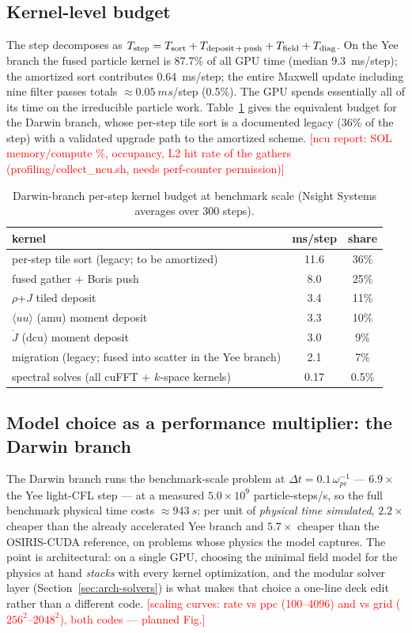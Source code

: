 \documentclass[11pt]{article}
\newcommand{\tocheck}[1]{\textcolor{red}{[#1]}}
\begin{document}
\subsection{Kernel-level budget}
\label{sec:budget}
The step decomposes as
$T_{\rm step}=T_{\rm sort}+T_{\rm deposit\,+\,push}+T_{\rm field}+T_{\rm diag}$.
On the Yee branch the fused particle kernel is 87.7\% of all GPU time
(median \SI{9.3}{ms}/step); the amortized sort contributes
\SI{0.64}{ms}/step; the entire Maxwell update including nine filter
passes totals $\approx\SI{0.05}{ms}$/step (0.5\%). The GPU spends
essentially all of its time on the irreducible particle work.
Table~\ref{tab:darwinstep} gives the equivalent budget for the Darwin
branch, whose per-step tile sort is a documented legacy (36\% of the
step) with a validated upgrade path to the amortized scheme.
\tocheck{ncu report: SOL memory/compute \%, occupancy, L2 hit rate of
the gathers (profiling/collect\_ncu.sh, needs perf-counter permission)}

\begin{table}[htbp]
\centering
\caption{Darwin-branch per-step kernel budget at benchmark scale
(Nsight Systems averages over 300 steps).}
\label{tab:darwinstep}
\begin{tabular}{lcc}
\toprule
kernel & ms/step & share\\
\midrule
per-step tile sort (legacy; to be amortized) & 11.6 & 36\%\\
fused gather + Boris push & 8.0 & 25\%\\
$\rho$+$J$ tiled deposit & 3.4 & 11\%\\
$\langle uu\rangle$ (amu) moment deposit & 3.3 & 10\%\\
$\dot J$ (dcu) moment deposit & 3.0 & 9\%\\
migration (legacy; fused into scatter in the Yee branch) & 2.1 & 7\%\\
spectral solves (all cuFFT + $k$-space kernels) & 0.17 & 0.5\%\\
\bottomrule
\end{tabular}
\end{table}

\subsection{Model choice as a performance multiplier: the Darwin branch}
\label{sec:perf-darwin}
The Darwin branch runs the benchmark-scale problem at
$\Delta t=0.1\,\omega_{pe}^{-1}$ --- $6.9\times$ the Yee light-CFL
step --- at a measured $5.0\times10^{9}$ particle-steps/s, so the full
benchmark physical time costs $\approx\SI{943}{s}$: per unit of
\emph{physical time simulated}, $2.2\times$ cheaper than the already
accelerated Yee branch and $5.7\times$ cheaper than the OSIRIS-CUDA
reference, on problems whose physics the model captures. The point is
architectural: on a single GPU, choosing the minimal field model for
the physics at hand \emph{stacks} with every kernel optimization, and
the modular solver layer (Section~\ref{sec:arch-solvers}) is what makes
that choice a one-line deck edit rather than a different code.
\tocheck{scaling curves: rate vs ppc (100--4096) and vs grid
($256^2$--$2048^2$), both codes --- planned Fig.}
\end{document}
